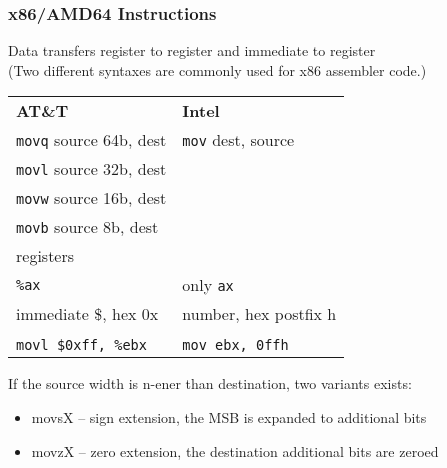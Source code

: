 \documentclass{beamer}
\begin{document}
\begin{frame}
\frametitle{x86/AMD64 Instructions}
Data transfers register to register and immediate to register \\
(Two different syntaxes are commonly used for x86 assembler code.)\\

\begin{tabular}{ l l }
\textbf{AT\&T} & \textbf{Intel}\\
\texttt{movq} source 64b, dest &	\texttt{mov} dest, source\\
\texttt{movl} source 32b, dest &\\
\texttt{movw} source 16b, dest &\\
\texttt{movb} source 8b, dest &\\
registers  &\\
\texttt{\%ax}	& only \texttt{ax}\\
immediate \$, hex 0x & number, hex postfix h\\
&\\
\texttt{movl \$0xff, \%ebx} & \texttt{mov ebx, 0ffh}\\
\end{tabular}

If the source width is n-ener than destination, two variants exists:
\begin{itemize}
 \item movsX -- sign extension, the MSB is expanded to additional bits
 \item movzX -- zero extension, the destination additional bits are zeroed
\end{itemize}
 
\end{frame}
\end{document}
